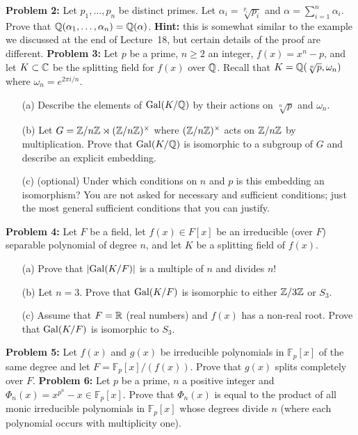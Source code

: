 \documentclass[12pt]{amsart}
\begin{document}
\skv
{\bf Problem 2:} \rm Let $p_1,\ldots, p_n$ be distinct primes. Let $\alpha_i=\sqrt[p_i]{p_i}$ and $\alpha=\sum\limits_{i=1}^n \alpha_i$. Prove that ${\mathbb Q}(\alpha_1,\ldots,\alpha_n)={\mathbb Q}(\alpha)$. {\bf Hint:} this is somewhat similar to the example we discussed at the end of Lecture~18, but certain details of the proof are different.
\skv
{\bf Problem 3:} \rm  Let $p$ be a prime, $n\geq 2$ an integer, $f(x)=x^n-p$, and let
$K\subset {\mathbb C}$ be the splitting field for $f(x)$ over ${\mathbb Q}$.
Recall that $K={\mathbb Q}(\sqrt[n]{p},\omega_n)$ where
$\omega_n=e^{2\pi i/n}$.
\begin{itemize}
\item[(a)] Describe the elements of ${\rm Gal}(K/{\mathbb Q})$ by their actions on $\sqrt[n]{p}$
and $\omega_n$.
\item[(b)] Let $G={\mathbb Z}/n{\mathbb Z}\rtimes ({\mathbb Z}/n{\mathbb Z})^{\times}$ where 
$({\mathbb Z}/n{\mathbb Z})^{\times}$
acts on ${\mathbb Z}/n{\mathbb Z}$ by multiplication. Prove that ${\rm Gal}(K/{\mathbb Q})$ is isomorphic
to a subgroup of $G$ and describe an explicit embedding. 
\item[(c)] (optional) Under which conditions on $n$ and $p$ is this embedding an isomorphism? 
You are not asked for necessary and sufficient conditions; just the most general sufficient
conditions that you can justify.
\end{itemize}
\skv
{\bf Problem 4:} \rm Let $F$ be a field, let $f(x)\in F[x]$
be an irreducible (over $F$) separable polynomial of degree $n$,
and let $K$ be a splitting field of $f(x)$.

\begin{itemize}
\item[(a)] Prove that $|{\rm Gal}(K/F)|$ is a multiple of $n$ and divides $n!$

\item[(b)] Let $n=3$. Prove that ${\rm Gal}(K/F)$ is isomorphic to either ${\mathbb Z}/3{\mathbb Z}$ or $S_3$.

\item[(c)] Assume that $F={\mathbb R}$ (real numbers) and $f(x)$ has a non-real root. Prove that
${\rm Gal}(K/F)$ is isomorphic to $S_3$.
\end{itemize}
\skv
{\bf Problem 5:} Let $f(x)$ and $g(x)$ be irreducible polynomials in $\mathbb F_p[x]$
of the same degree and let $F=\mathbb F_p[x]/(f(x))$. Prove that $g(x)$ splits completely over $F$.
\skv
{\bf Problem 6:} Let $p$ be a prime, $n$ a positive integer and
$\Phi_n(x)=x^{p^n}-x\in \mathbb F_p[x]$. Prove that $\Phi_n(x)$ is equal to the product
of all monic irreducible polynomials in $\mathbb F_p[x]$ whose degrees divide $n$
(where each polynomial occurs with multiplicity one).
\skv
\end{document}
